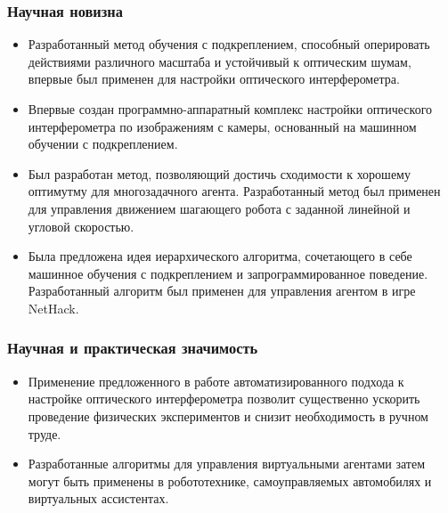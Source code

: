 \begin{frame}
    \frametitle{Научная новизна}
    \begin{itemize}
        \item Разработанный метод обучения с подкреплением, способный оперировать действиями различного масштаба и устойчивый к оптическим шумам, впервые был применен для настройки оптического интерферометра.
        \item Впервые создан программно-аппаратный комплекс настройки оптического интерферометра по изображениям с камеры, основанный на машинном обучении с подкреплением.
        \item Был разработан метод, позволяющий достичь сходимости к хорошему оптимутму для многозадачного агента. Разработанный метод был применен для управления движением шагающего робота с заданной линейной и угловой скоростью.
        \item Была предложена идея иерархического алгоритма, сочетающего в себе машинное обучения с подкреплением и запрограммированное поведение. 
        Разработанный алгоритм был применен для управления агентом в игре NetHack. 
    \end{itemize}
\end{frame}

\begin{frame}
    \frametitle{Научная и практическая значимость}
    \begin{itemize}
        \item Применение предложенного в работе автоматизированного подхода к настройке оптического интерферометра позволит существенно ускорить проведение физических экспериментов и снизит необходимость в ручном труде.
        \item Разработанные алгоритмы для управления виртуальными агентами затем могут быть применены в робототехнике, самоуправляемых автомобилях и виртуальных ассистентах.
    \end{itemize}
\end{frame}

